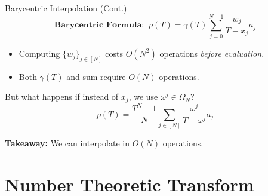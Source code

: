 \documentclass{zkdl-presentation-template}
\begin{document}
    \begin{frame}{Barycentric Interpolation (Cont.)}
        \begin{equation*}
            \boxed{\textbf{Barycentric Formula:} \; \; p(T) = \gamma(T)\sum_{j=0}^{N-1}\frac{w_j}{T-x_j}a_j}
        \end{equation*}
        \pause

        \begin{proposition}
            \begin{itemize}
                \item Computing $\{w_j\}_{j \in [N]}$ costs $O(N^2)$
                operations \emph{before evaluation}.\pause
                \item Both $\gamma(T)$ and sum require $O(N)$ operations.
            \end{itemize}
        \end{proposition}
        \pause

        But what happens if instead of $x_j$, we use $\omega^j \in \Omega_N$?\pause
        \begin{equation*}
            \boxed{p(T) = \frac{T^N-1}{N}\sum_{j \in [N]}\frac{\omega^j}{T-\omega^j}a_j}
        \end{equation*}
        \pause

        \textcolor{oc-pink-7}{\textbf{Takeaway:}} We can interpolate in $O(N)$ operations.
    \end{frame}

    \section{Number Theoretic Transform}
\end{document}
